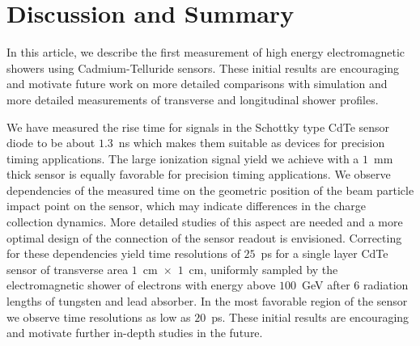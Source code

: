 
\section{Discussion and Summary}
\label{sec:summary} 


In this article, we describe the first measurement of high energy 
electromagnetic showers using Cadmium-Telluride sensors. 
These initial results are encouraging and motivate future work on 
more detailed comparisons with simulation and more detailed 
measurements of transverse and longitudinal shower profiles.



We have measured the rise time for signals in the Schottky type CdTe sensor diode to be about 
$1.3$~ns which makes them suitable as devices for precision timing applications.
The large ionization signal yield we achieve with a $1$~mm thick sensor is equally favorable for precision
timing applications.
We observe dependencies of the measured time on the geometric position of the
beam particle impact point on the sensor, which may indicate differences in the charge collection dynamics.
More detailed studies of this aspect are needed and a more optimal design of the 
connection of the sensor readout is envisioned. Correcting for these dependencies yield time resolutions
of $25$~ps for a single layer CdTe sensor of transverse area $1$~cm~$\times$~$1$~cm,
 uniformly sampled by the electromagnetic shower of electrons with energy above $100$~GeV 
after $6$ radiation lengths of tungsten and lead absorber. In the most favorable region of the sensor we 
observe time resolutions as low as $20$~ps. These initial results are encouraging and motivate 
further in-depth studies in the future.



